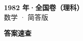\documentclass[zihao=-4, a4paper]{ctexart}
\begin{document}
\begin{center}
  {\Large\bfseries 1982 年·全国卷（理科）}\\[4pt]
  {\large 数学 · 简答版}
\end{center}
\medskip
{}

\clearpage
{}
\begin{center}{\Large\bfseries 答案速查}\end{center}
\medskip

\end{document}
